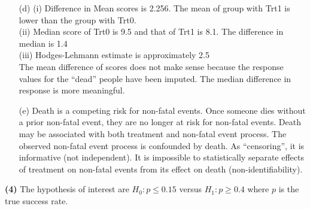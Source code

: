 \documentclass[11pt,a4paper]{article}
\begin{document}
\begin{enumerate}
\item[(d)]
(i) Difference in Mean scores is 2.256. The mean of group with Trt1 is lower than the group with Trt0. \\

(ii) Median score of Trt0 is 9.5 and that of Trt1 is 8.1. The difference in median is 1.4 \\

(iii) Hodges-Lehmann estimate is approximately 2.5 \\
The mean difference of scores does not make sense because the response values for the ``dead'' people have been imputed. The median difference in response is more meaningful.
\item[(e)] Death is a competing risk for non-fatal events. Once someone dies without a prior non-fatal event, they are no longer at risk for non-fatal events. Death may be associated with both treatment and non-fatal event process. The observed non-fatal event process is confounded by death. As ``censoring'', it is informative (not independent). It is impossible to statistically separate effects of treatment on non-fatal events from its effect on death (non-identifiability).

\end{enumerate}
\noindent
\textbf{(4)} 
The hypothesis of interest are $H_0:p\leq 0.15$ versus $H_1:p\geq 0.4$ where $p$ is the true success rate. 
\end{document}
